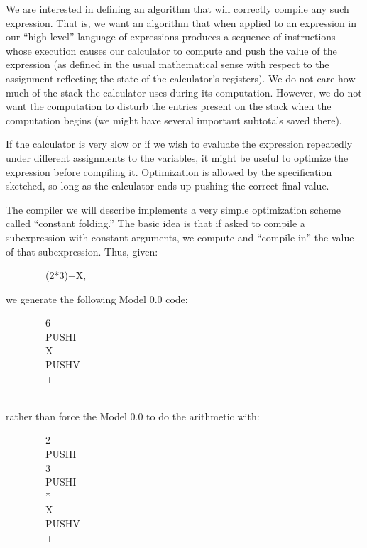 \documentclass[10pt]{book}
\newenvironment{pubasis}{\begin{flushleft}}{\end{flushleft}}
\begin{document}
We are interested in defining an algorithm that will correctly compile
any such expression.  That is, we want an algorithm that when applied
to an expression in our ``high-level'' language of expressions 
produces a sequence of instructions whose execution 
causes our calculator
to compute and push the value of the expression (as defined in
the usual mathematical sense with respect to the assignment
reflecting the state of the calculator's registers).
We do not care how much of the stack the calculator
uses during its computation.  However, we do not want the computation
to disturb the entries present on the stack when the computation
begins (we might have several important subtotals saved there).

If the calculator is very slow or if we wish to evaluate the expression repeatedly under
different assignments to the variables, it might be useful to optimize the expression
before compiling it.  Optimization is allowed by the specification
sketched, so long as the calculator ends up pushing the correct final value.

The compiler we will describe implements a very simple optimization scheme called
``constant folding.''  The basic idea is that if asked to compile a subexpression
with constant arguments, we compute and ``compile in'' the value of
that subexpression.  Thus, given:

\begin{pubasis}
~~~~~~~~(2*3)+X,\\
\end{pubasis}
we generate the following Model 0.0 code:
\begin{pubasis}
~~~~~~~~6\\
~~~~~~~~PUSHI\\
~~~~~~~~X\\
~~~~~~~~PUSHV\\
~~~~~~~~+\\
~~~~~~~~\\
\end{pubasis}
rather than force the Model 0.0 to do the arithmetic with:
\begin{pubasis}
~~~~~~~~2\\
~~~~~~~~PUSHI\\
~~~~~~~~3\\
~~~~~~~~PUSHI\\
~~~~~~~~*\\
~~~~~~~~X\\
~~~~~~~~PUSHV\\
~~~~~~~~+\\
\end{pubasis}
\end{document}
